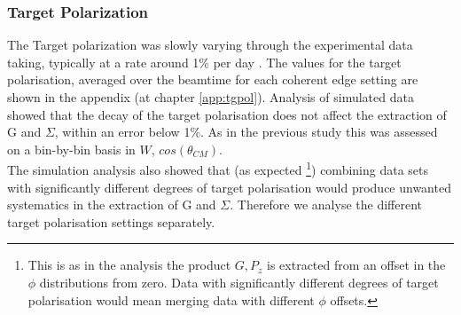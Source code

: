 \subsubsection{Target Polarization}\label{sec:tg_pol_sys}
The Target polarization was slowly varying through the experimental data taking, typically at a rate around 1\% per day \cite{Keith_2012}. The values for the target polarisation, averaged over the beamtime for each coherent edge setting are shown in the appendix (at chapter \ref{app:tgpol}).  Analysis of simulated data showed that the decay of the target polarisation does not affect the extraction of G and $\Sigma$, within an error below 1\%. As in the previous study this was assessed on a bin-by-bin basis in $W$, $cos(\theta_{CM})$. \\
The simulation analysis also showed that (as expected \footnote{This is as in the analysis the product $G,P_z$ is extracted from an offset in the $\phi$ distributions from zero. Data with significantly different degrees of target polarisation would mean merging data with different $\phi$ offsets.}) combining data sets with significantly different degrees of target polarisation would produce unwanted systematics in the extraction of G and $\Sigma$. Therefore we analyse the different target polarisation settings separately. 

  
